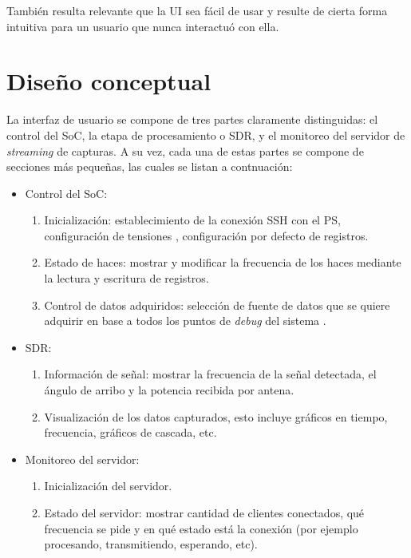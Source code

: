 \documentclass[../../main.tex]{subfiles}
\begin{document}
También resulta relevante que la UI sea fácil de usar y resulte de cierta forma intuitiva para un usuario que nunca interactuó con ella.

\section{Diseño conceptual}\label{sec::disenio-conceptual}
La interfaz de usuario se compone de tres partes claramente distinguidas: el control del SoC, la etapa de procesamiento o SDR, y el monitoreo del servidor de \textit{streaming} de capturas. A su vez, cada una de estas partes se compone de secciones más pequeñas, las cuales se listan a contnuación:

\begin{itemize}
    \item Control del SoC:
    \begin{enumerate}
        \item Inicialización: establecimiento de la conexión SSH con el PS, configuración de tensiones , configuración por defecto de registros.
        \item Estado de haces: mostrar y modificar la frecuencia de los haces mediante la lectura y escritura de registros.
        \item Control de datos adquiridos: selección de fuente de datos que se quiere adquirir en base a todos los puntos de \textit{debug} del sistema .
    \end{enumerate}
    \item SDR:
    \begin{enumerate}
        \item Información de señal: mostrar la frecuencia de la señal detectada, el ángulo de arribo  y la potencia recibida por antena.
        \item Visualización de los datos capturados, esto incluye gráficos en tiempo, frecuencia, gráficos de cascada, etc.
    \end{enumerate}
    \item Monitoreo del servidor:
    \begin{enumerate}
        \item Inicialización del servidor.
        \item Estado del servidor: mostrar cantidad de clientes conectados, qué frecuencia se pide y en qué estado está la conexión (por ejemplo procesando, transmitiendo, esperando, etc).
    \end{enumerate}
\end{itemize}
\end{document}
